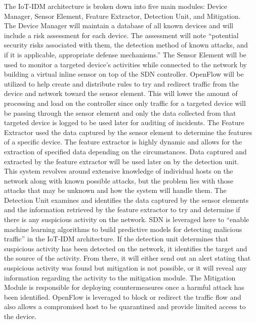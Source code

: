 The IoT-IDM architecture is broken down into five main modules: Device Manager, Sensor Element, Feature Extractor, Detection Unit, and Mitigation. \cite {nobakht2016host} 
The Device Manager will maintain a database of all known devices and will include a risk assessment for each device. The assessment will note “potential security risks associated with them, the detection method of known attacks, and if it is applicable, appropriate defense mechanisms.” \cite {nobakht2016host} The Sensor Element will be used to monitor a targeted device’s activities while connected to the network by building a virtual inline sensor on top of the SDN controller. OpenFlow will be utilized to help create and distribute rules to try and redirect traffic from the device and network toward the sensor element. This will lower the amount of processing and load on the controller since only traffic for a targeted device will be passing through the sensor element and only the data collected from that targeted device is logged to be used later for auditing of incidents. The Feature Extractor used the data captured by the sensor element to determine the features of a specific device. The feature extractor is highly dynamic and allows for the extraction of specified data depending on the circumstances. Data captured and extracted by the feature extractor will be used later on by the detection unit. This system revolves around extensive knowledge of individual hosts on the network along with known possible attacks, but the problem lies with those attacks that may be unknown and how the system will handle them. The Detection Unit examines and identifies the data captured by the sensor elements and the information retrieved by the feature extractor to try and determine if there is any suspicious activity on the network. SDN is leveraged here to “enable machine learning algorithms to build predictive models for detecting malicious traffic” in the IoT-IDM architecture. \cite {nobakht2016host} If the detection unit determines that suspicious activity has been detected on the network, it identifies the target and the source of the activity. From there, it will either send out an alert stating that suspicious activity was found but mitigation is not possible, or it will reveal any information regarding the activity to the mitigation module. The Mitigation Module is responsible for deploying countermeasures once a harmful attack has been identified. OpenFlow is leveraged to block or redirect the traffic flow and also allows a compromised host to be quarantined and provide limited access to the device. 

